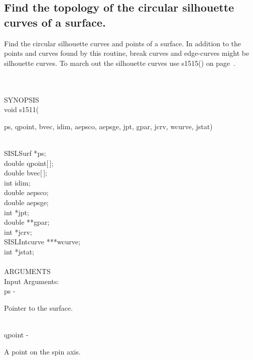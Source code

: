 \subsection{Find the topology of the circular silhouette curves of a
\mbox{surface}.}
\begin{minipg1}
  Find the circular silhouette curves and points of a surface.
  In addition to the points and curves found by this routine,
  break curves and edge-curves might be silhouette curves.
  To march out the silhouette curves use s1515() on page~\pageref{s1515}.
\end{minipg1} \\ \\
SYNOPSIS\\
        \> void s1511(\begin{minipg3}
          {\fov ps}, {\fov qpoint}, {\fov bvec}, {\fov idim}, {\fov aepsco}, {\fov aepsge}, {\fov jpt},  {\fov gpar},  {\fov jcrv},  {\fov wcurve},  {\fov jstat})
        \end{minipg3}\\[0.3ex]
        \>\>    SISLSurf \> *{\fov ps};\\
        \>\>    double   \> {\fov qpoint}[\,];\\
        \>\>    double   \> {\fov bvec}[\,];\\
        \>\>    int      \> {\fov idim};\\
        \>\>    double   \> {\fov aepsco};\\
        \>\>    double   \> {\fov aepsge};\\
        \>\>    int      \> *{\fov jpt};\\
        \>\>    double   \> **{\fov gpar};\\
        \>\>    int      \> *{\fov jcrv};\\
        \>\>    SISLIntcurve \> ***{\fov wcurve};\\
        \>\>    int      \> *{\fov jstat};\\
\\
ARGUMENTS\\
        \>Input Arguments:\\
        \>\>    {\fov ps}\> - \>  \begin{minipg2}
                          Pointer to the surface.
                               \end{minipg2}\\
        \>\>    {\fov qpoint}\> - \>  \begin{minipg2}
                       A point on the spin axis.
                               \end{minipg2}\\
